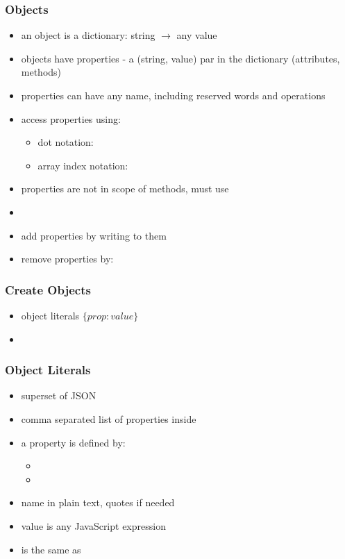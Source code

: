 \begin{frame}[fragile] \frametitle{Objects}
\begin{itemize}
  \item an object is a dictionary: string $\rightarrow$ any value
  \item objects have properties - a (string, value) par in the dictionary (attributes, methods)
  \item properties can have any name, including reserved words and operations
  \item access properties using:
  \begin{itemize}
    \item dot notation: 
    \item array index notation: 
  \end{itemize}
  \item properties are not in scope of methods, must use 
  \item {}
  \item add properties by writing to them 
  \item remove properties by: 
\end{itemize}
\end{frame}

\begin{frame}[fragile] \frametitle{Create Objects}
\begin{itemize}
  \item object literals $\{prop: value\}$
  \item {}
\end{itemize}
\end{frame}

\begin{frame}[fragile] \frametitle{Object Literals}
\begin{itemize}
  \item superset of JSON
  \item comma separated list of properties inside \code{\{ \}}
  \item a property is defined by:
  \begin{itemize}
    \item {}
    \item {}
  \end{itemize}
  \item name in plain text, quotes if needed 
  \item value is any JavaScript expression
  \item {} is the same as 
\end{itemize}
\end{frame}


